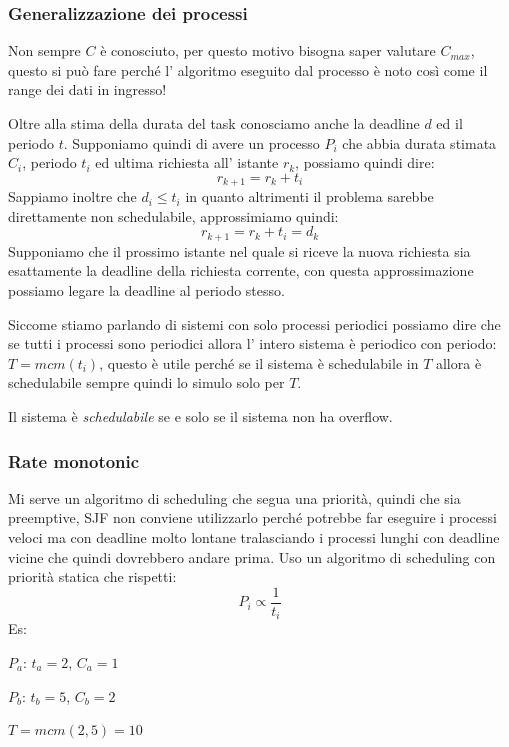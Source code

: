 \subsubsection{Generalizzazione dei processi}
Non sempre $C$ è conosciuto, per questo motivo bisogna saper valutare $C_{max}$, questo si può fare perché l' algoritmo eseguito dal processo è noto così come il range dei dati in ingresso!

Oltre alla stima della durata del task conosciamo anche la deadline $d$ ed il periodo $t$.
Supponiamo quindi di avere un processo $P_i$ che abbia durata stimata $C_i$, periodo $t_i$ ed ultima richiesta all' istante $r_k$, possiamo quindi dire:
$$ r_{k+1} = r_k + t_i $$
Sappiamo inoltre che $d_i \leq t_i$ in quanto altrimenti il problema sarebbe direttamente non schedulabile, approssimiamo quindi:
$$ r_{k+1} = r_k + t_i = d_k $$
Supponiamo che il prossimo istante nel quale si riceve la nuova richiesta sia esattamente la deadline della richiesta corrente, con questa approssimazione possiamo legare la deadline al periodo stesso.

Siccome stiamo parlando di sistemi con solo processi periodici possiamo dire che se tutti i processi sono periodici allora l' intero sistema è periodico con periodo: $ T = mcm(t_i) $, questo è utile perché se il sistema è schedulabile in $T$ allora è schedulabile sempre quindi lo simulo solo per $T$.

Il sistema è \emph{schedulabile} se e solo se il sistema non ha overflow.

\subsubsection{Rate monotonic}
Mi serve un algoritmo di scheduling che segua una priorità, quindi che sia preemptive, SJF non conviene utilizzarlo perché potrebbe far eseguire i processi veloci ma con deadline molto lontane tralasciando i processi lunghi con deadline vicine che quindi dovrebbero andare prima.
Uso un algoritmo di scheduling con priorità statica che rispetti:
$$ P_i \propto \frac{1}{t_i} $$
Es:

$P_a$: $t_a = 2$, $C_a = 1$

$P_b$: $t_b = 5$, $C_b = 2$

$ T=mcm(2,5) = 10 $

